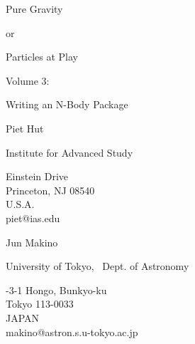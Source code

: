 
\thispagestyle{empty}                 %

\bigskip\bigskip\bigskip\bigskip\bigskip\bigskip
\begin{center}

{\lggggb Pure Gravity}

\medskip

{\lgb or}

\medskip

{\lggb Particles at Play}

\bigskip\bigskip\bigskip\bigskip\bigskip

{\lgb Volume 3:}

\bigskip

{\lggb Writing an N-Body Package}

\bigskip\bigskip\bigskip\bigskip\bigskip

{\lggr Piet Hut}

{\lgr Institute for Advanced Study}

{ Einstein Drive}\\
{\lr Princeton, NJ 08540}\\
{\lr U.S.A.}\\
{\lr piet@ias.edu}

\bigskip

{\lggr Jun Makino}

{\lgr University of Tokyo, \ Dept. of Astronomy}

{-3-1 Hongo, Bunkyo-ku}\\
{\lr Tokyo 113-0033}\\
{\lr JAPAN}\\
{\lr makino@astron.s.u-tokyo.ac.jp}

\end{center}
